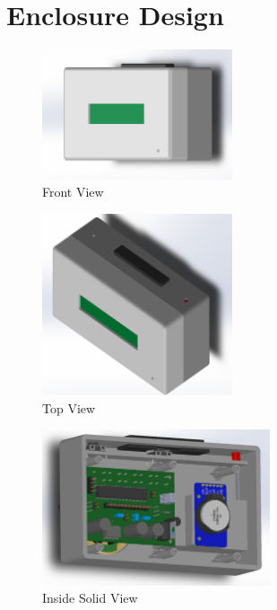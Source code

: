 \documentclass[12pt,twocolumn]{article}
\begin{document}
\newpage
\section{Enclosure Design}
\begin{center}
    \begin{figure}[!h]
        \centering\includegraphics[width=0.50\textwidth]{fronte}
        \caption*{Front View}
    \end{figure}
\end{center}

\begin{center}
    \begin{figure}[!h]
        \centering\includegraphics[width=0.50\textwidth]{tope}
        \caption*{Top View}
    \end{figure}
\end{center}

\begin{center}
    \begin{figure}[!h]
        \centering\includegraphics[width=0.60\textwidth]{backbb}
        \caption*{Inside Solid View}
    \end{figure}
\end{center}
\end{document}
